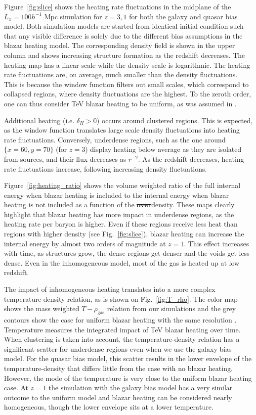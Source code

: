 \documentclass[numberedappendix]{emulateapj}
\newcommand\ALc[1]{{\color{red} \bf #1}} %
\begin{document}
Figure~\ref{fig:slice} shows the heating rate fluctuations in the midplane of the $L_x=100h^{-1}$ Mpc simulation for $z=3,1$ for both the galaxy and quasar bias model. Both simulation models are started from identical initial condition such that any visible difference is solely due to the different bias assumptions in the blazar heating model. The corresponding density field is shown in the upper column and shows increasing structure formation as the redshift decreases. The heating map has a linear scale while the density scale is logarithmic. The heating rate fluctuations are, on average, much smaller than the density fluctuations. This is because the window function filters out small scales, which correspond to collapsed regions, where density fluctuations are the highest. To the zeroth order, one can thus consider TeV blazar heating to be uniform, as was assumed in \citet{2012ApJ...752...23C}.

Additional heating (i.e. $\delta_H>0$) occurs around clustered regions. This is expected, as the window function translates large scale density fluctuations into heating rate fluctuations. Conversely, underdense regions, such as the one around $\{x=60,y=70\}$ (for $z=3$) display heating below average as they are isolated from sources, and their flux decreases as $r^{-2}$. As the redshift decreases, heating rate fluctuations increase, following increasing density fluctuations.

Figure~\ref{fig:heating_ratio} shows the volume weighted ratio of the full internal energy when blazar heating is included to the internal energy when blazar heating is not included as a function of the \ALc{\sout{over}}density. These maps clearly highlight that blazar heating has more impact in underdense regions, as the heating rate per baryon is higher. Even if these regions receive less heat than regions with higher density (see Fig.~\ref{fig:slice}),  blazar heating can increase the internal energy by almost two orders of magnitude at $z=1$. This effect increases with time, as structures grow, the dense regions get denser and the voids get less dense. Even in the inhomogeneous model, most of the gas is heated up at low redshift.

The impact of inhomogeneous heating translates into a more complex temperature-density relation, as is shown on Fig.~\ref{fig:T_rho}. The color map shows the mass weighted $T-\rho_{\mathrm{gas}}$ relation from our simulations and the grey contours show the case for uniform blazar heating with the same resolution \citep{2012MNRAS.423..149P}. Temperature measures the integrated impact of TeV blazar heating over time. When clustering is taken into account, the temperature-density relation has a significant scatter for underdense regions even when we use the galaxy bias model. For the quasar bias model, this scatter results in the lower envelope of the temperature-density that differs little from the case with no blazar heating. However, the mode of the temperature is very close to the uniform blazar heating case. At $z=1$ the simulation with the galaxy bias model has a very similar outcome to the uniform model and blazar heating can be considered nearly homogeneous, though the lower envelope sits at a lower temperature.
\end{document}
